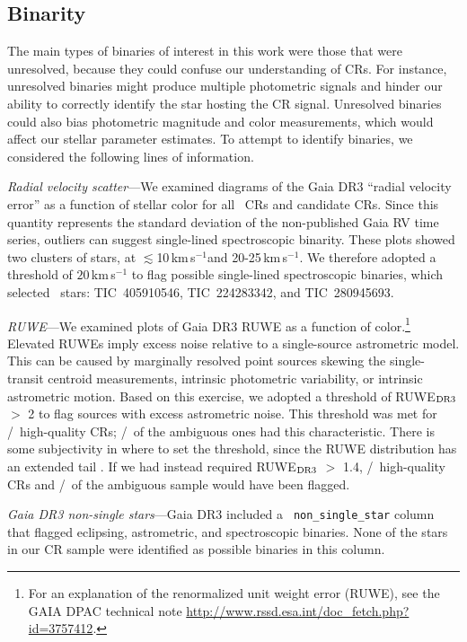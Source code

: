 \documentclass[11pt,twocolumn,tighten]{aastex63}
\newcommand{\kms}{{km\,s$^{-1}$}}
\begin{document}
\subsection{Binarity}
\label{subsec:binarity}

The main types of binaries of interest in this work were those that
were unresolved, because they could confuse our understanding of CRs.
For instance, unresolved binaries might produce multiple photometric
signals and hinder our ability to correctly identify the star hosting
the CR signal.  Unresolved binaries could also bias photometric magnitude
and color measurements, which would affect our stellar parameter
estimates.  To attempt to identify binaries, we considered the
following lines of information.

{\it Radial velocity scatter}---We examined diagrams of the Gaia DR3
``radial velocity error'' as a function of stellar color for all
\ncqvsnodebunked\ CRs and candidate CRs.  Since this quantity
represents the standard deviation of the non-published Gaia RV time
series, outliers can suggest single-lined spectroscopic binarity.
These plots showed two clusters of stars, at $\lesssim$10\,\kms and
20-25\,\kms.  We therefore adopted a threshold of $20$\,km\,s$^{-1}$ to
flag possible single-lined spectroscopic binaries, which selected
\nrvscatterflag\ stars: TIC~405910546, TIC~224283342, and
TIC~280945693.

{\it RUWE}---We examined plots of Gaia DR3 RUWE as a function of
color.\footnote{For an explanation of the renormalized unit weight
error (RUWE), see the GAIA DPAC technical note
\url{http://www.rssd.esa.int/doc_fetch.php?  id=3757412}.}  Elevated
RUWEs imply excess noise relative to a single-source astrometric
model.  This can be caused by marginally resolved point sources
skewing the single-transit centroid measurements,  intrinsic
photometric variability, or intrinsic astrometric motion.  Based on
this exercise, we adopted a threshold of RUWE$_{\rm DR3}$ $>$ 2 to
flag sources with excess astrometric noise.  This threshold was met
for \ngoodhighruwe/\ngoods\ high-quality CRs;
\nmaybehighruwe/\nmaybes\ of the ambiguous ones had this
characteristic.  There is some subjectivity in where to set the
threshold, since the RUWE distribution has an extended tail
\citep[e.g.][]{2022MNRAS.513.5270P}.  If we had instead required
RUWE$_{\rm DR3}$ $>$ 1.4, \ngoodweakruwe/\ngoods\ high-quality CRs
and \nmaybeweakruwe/\nmaybes\ of the ambiguous sample would have been
flagged.

{\it Gaia DR3 non-single stars}---Gaia DR3 included a {\tt
non\_single\_star} column that flagged eclipsing, astrometric, and
spectroscopic binaries.  None of the stars in our CR sample were
identified as possible binaries in this column.
\end{document}
